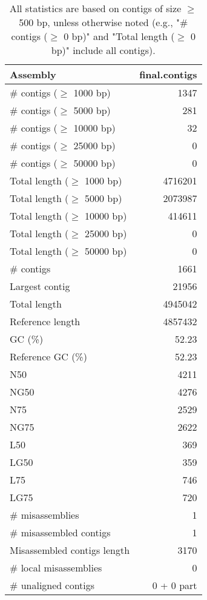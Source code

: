 \documentclass[12pt,a4paper]{article}
\begin{document}
\begin{table}[ht]
\begin{center}
\caption{All statistics are based on contigs of size $\geq$ 500 bp, unless otherwise noted (e.g., "\# contigs ($\geq$ 0 bp)" and "Total length ($\geq$ 0 bp)" include all contigs).}
\begin{tabular}{|l*{1}{|r}|}
\hline
Assembly & final.contigs \\ \hline
\# contigs ($\geq$ 1000 bp) & 1347 \\ \hline
\# contigs ($\geq$ 5000 bp) & 281 \\ \hline
\# contigs ($\geq$ 10000 bp) & 32 \\ \hline
\# contigs ($\geq$ 25000 bp) & 0 \\ \hline
\# contigs ($\geq$ 50000 bp) & 0 \\ \hline
Total length ($\geq$ 1000 bp) & 4716201 \\ \hline
Total length ($\geq$ 5000 bp) & 2073987 \\ \hline
Total length ($\geq$ 10000 bp) & 414611 \\ \hline
Total length ($\geq$ 25000 bp) & 0 \\ \hline
Total length ($\geq$ 50000 bp) & 0 \\ \hline
\# contigs & 1661 \\ \hline
Largest contig & 21956 \\ \hline
Total length & 4945042 \\ \hline
Reference length & 4857432 \\ \hline
GC (\%) & 52.23 \\ \hline
Reference GC (\%) & 52.23 \\ \hline
N50 & 4211 \\ \hline
NG50 & 4276 \\ \hline
N75 & 2529 \\ \hline
NG75 & 2622 \\ \hline
L50 & 369 \\ \hline
LG50 & 359 \\ \hline
L75 & 746 \\ \hline
LG75 & 720 \\ \hline
\# misassemblies & 1 \\ \hline
\# misassembled contigs & 1 \\ \hline
Misassembled contigs length & 3170 \\ \hline
\# local misassemblies & 0 \\ \hline
\# unaligned contigs & 0 + 0 part \\ \hline

\end{tabular}
\end{center}
\end{table}
\end{document}
